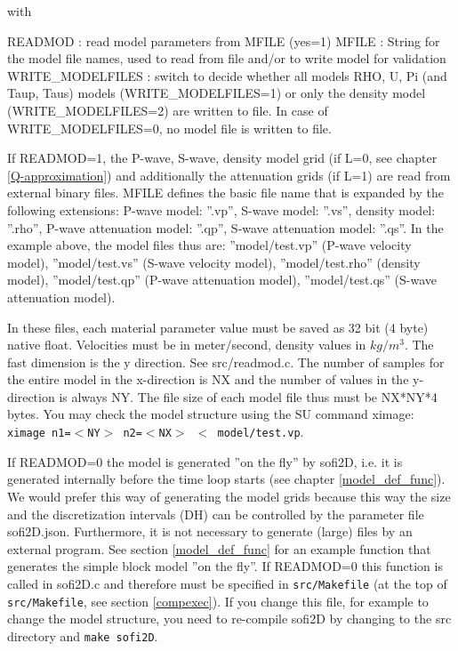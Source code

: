 \documentclass[11pt,onecolumn,oneside]{article}
\begin{document}
with

READMOD : read model parameters from MFILE (yes=1)\newline
MFILE : String for the model file names, used to read from file and/or to write model for validation \newline
WRITE\_MODELFILES : switch to decide whether all models RHO, U, Pi (and Taup, Taus) models (WRITE\_MODELFILES=1) or only the density model (WRITE\_MODELFILES=2) are written to file. In case of WRITE\_MODELFILES=0, no model file is written to file. \newline

If READMOD=1, the P-wave, S-wave, density model grid (if L=0, see chapter \ref{Q-approximation}) and additionally the attenuation grids (if L=1) are read from external binary files. MFILE defines the basic file name that is expanded by the following extensions: P-wave model: ''.vp'', S-wave model: ''.vs'', density model: ''.rho'', P-wave attenuation model: ''.qp'', S-wave attenuation model: ''.qs''.  In the example above, the model files thus are: ''model/test.vp'' (P-wave velocity model), ''model/test.vs'' (S-wave velocity model), ''model/test.rho'' (density model), ''model/test.qp'' (P-wave attenuation model), ''model/test.qs'' (S-wave attenuation model). 

In these files, each material parameter value must be saved as 32 bit (4 byte) native float. Velocities must be in meter/second, density values in $kg/m^3$. The fast dimension is the y direction. See src/readmod.c. The number of samples for the entire model in the x-direction is NX and the number of values in the y-direction is always NY. The file size of each model file thus must be NX*NY*4 bytes. You may check the model structure using the SU command ximage: \texttt{ximage n1=$<$NY$>$ n2=$<$NX$>$ $<$ model/test.vp}.

If READMOD=0 the model is generated ''on the fly'' by sofi2D, i.e. it is generated internally before the time loop starts (see chapter \ref{model_def_func}). We would prefer this way of generating the model grids because this way the size and the discretization intervals (DH) can be controlled by the parameter file sofi2D.json. Furthermore, it is not necessary to generate (large) files by an external program. See section \ref{model_def_func} for an example function that generates the simple block model ''on the fly''. If READMOD=0 this function is called in sofi2D.c and therefore must be specified in \texttt{src/Makefile} (at the top of \texttt{src/Makefile}, see section \ref{compexec}). If you change this file, for example to change the model structure, you need to re-compile sofi2D by changing to the src directory and \texttt{make sofi2D}.
\end{document}
